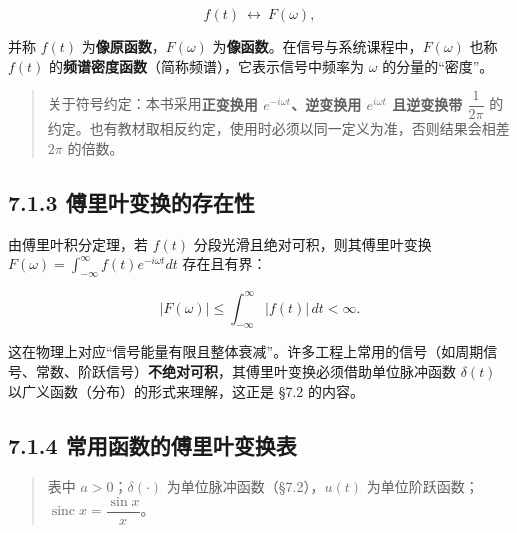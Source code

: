 \[
f(t)\ \longleftrightarrow\ F(\omega),
\]

并称 \(f(t)\) 为\textbf{像原函数}，\(F(\omega)\)
为\textbf{像函数}。在信号与系统课程中，\(F(\omega)\) 也称 \(f(t)\)
的\textbf{频谱密度函数}（简称频谱），它表示信号中频率为 \(\omega\)
的分量的``密度''。

\begin{quote}
关于符号约定：本书采用\textbf{正变换用 \(e^{-i\omega t}\)、逆变换用
\(e^{i\omega t}\) 且逆变换带 \(\dfrac{1}{2\pi}\)}
的约定。也有教材取相反约定，使用时必须以同一定义为准，否则结果会相差
\(2\pi\) 的倍数。
\end{quote}

\subsection{7.1.3
傅里叶变换的存在性}\label{ux5085ux91ccux53f6ux53d8ux6362ux7684ux5b58ux5728ux6027}

由傅里叶积分定理，若 \(f(t)\) 分段光滑且绝对可积，则其傅里叶变换
\(F(\omega)=\int_{-\infty}^{\infty}f(t)e^{-i\omega t}dt\) 存在且有界：

\[
|F(\omega)|\le \int_{-\infty}^{\infty}|f(t)|\,dt<\infty .
\]

这在物理上对应``信号能量有限且整体衰减''。许多工程上常用的信号（如周期信号、常数、阶跃信号）\textbf{不绝对可积}，其傅里叶变换必须借助单位脉冲函数
\(\delta(t)\) 以广义函数（分布）的形式来理解，这正是 §7.2 的内容。

\subsection{7.1.4
常用函数的傅里叶变换表}\label{ux5e38ux7528ux51fdux6570ux7684ux5085ux91ccux53f6ux53d8ux6362ux8868}

\begin{quote}
表中 \(a>0\)；\(\delta(\cdot)\) 为单位脉冲函数（§7.2），\(u(t)\)
为单位阶跃函数；\(\operatorname{sinc}x=\dfrac{\sin x}{x}\)。
\end{quote}

